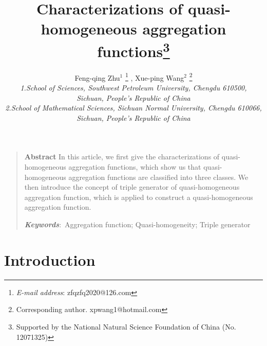 \documentclass[12pt]{article}
\begin{document}
\setcounter{page}{1}

\title{{\textbf{Characterizations of quasi-homogeneous aggregation functions}}\thanks {Supported by
the National Natural Science Foundation of China (No. 12071325)}}
\author{Feng-qing Zhu$^{1}$ \footnote{\emph{E-mail address}: zfqzfq2020@126.com} , Xue-ping Wang$^2$ \footnote{Corresponding author. xpwang1@hotmail.com}\\
\emph{\small {1.School of Sciences, Southwest Petroleum University, Chengdu 610500,}}\\\emph{\small {Sichuan, People's Republic of China}}\\
\emph{\small {2.School of Mathematical Sciences, Sichuan Normal University, Chengdu 610066,}}\\
\emph{\small {Sichuan, People's Republic of China}}}

\newcommand{\pp}[2]{\frac{\partial #1}{\partial #2}}
\date{}
\maketitle
\begin{quote}
{\bf Abstract}  In this article, we first give the characterizations of quasi-homogeneous aggregation functions, which show us that quasi-homogeneous aggregation functions are classified into three classes. We then introduce the concept of triple generator of quasi-homogeneous aggregation function, which is applied to construct a quasi-homogeneous aggregation function.

{\textbf{\emph{Keywords}}:}\, Aggregation function; Quasi-homogeneity; Triple generator
\end{quote}

\section{Introduction}
\end{document}
